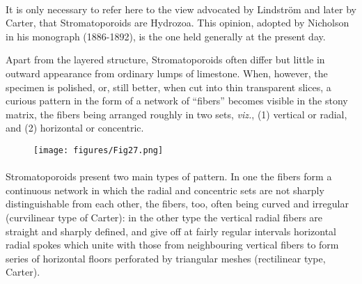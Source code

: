 \documentclass[a4paper, 12pt, oneside]{article}
\begin{document}
\paragraph{}
It is only necessary to refer here to the view advocated by Lindström and later by Carter, that Stromatoporoids are Hydrozoa. This opinion, adopted by Nicholson in his monograph (1886-1892), is the one held generally at the present day.

Apart from the layered structure, Stromatoporoids often differ but little in outward appearance from ordinary lumps of limestone. When, however, the specimen is polished, or, still better, when cut into thin transparent slices, a curious pattern in the form of a network of ``fibers'' becomes visible in the stony matrix, the fibers being arranged roughly in two sets, \emph{viz.}, (1) vertical or radial, and (2) horizontal or concentric.
\begin{figure}[H]
\centering
\texttt{[image: figures/Fig27.png]}
\caption*{}
\end{figure}
\paragraph{}
Stromatoporoids present two main types of pattern. In one the fibers form a continuous network in which the radial and concentric sets are not sharply distinguishable from each other, the fibers, too, often being curved and irregular (curvilinear type of Carter): in the other type the vertical radial fibers are straight and sharply defined, and give off at fairly regular intervals horizontal radial spokes which unite with those from neighbouring vertical fibers to form series of horizontal floors perforated by triangular meshes (rectilinear type, Carter).
\end{document}
